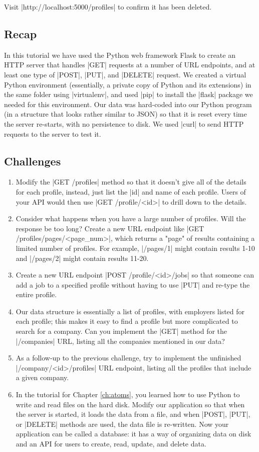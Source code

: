 \documentclass[11pt]{book}
\begin{document}
Visit |http://localhost:5000/profiles| to confirm it has been deleted.

\subsection*{Recap}

In this tutorial we have used the Python web framework Flask to create an HTTP server that handles |GET| requests at a number of URL endpoints, and at least one type of |POST|, |PUT|, and |DELETE| request.  We created a virtual Python environment (essentially, a private copy of Python and its extensions) in the same folder using |virtualenv|, and used |pip| to install the |flask| package we needed for this environment.  Our data was hard-coded into our Python program (in a structure that looks rather similar to JSON) so that it is reset every time the server re-starts, with no persistence to disk.  We used |curl| to send HTTP requests to the server to test it.


\subsection*{Challenges}

\begin{enumerate}
    \item Modify the |GET /profiles| method so that it doesn't give all of the details for each profile, instead, just list the |id| and name of each profile.  Users of your API would then use |GET /profile/<id>| to drill down to the details.
    \item Consider what happens when you have a large number of profiles.  Will the response be too long?  Create a new URL endpoint like |GET /profiles/pages/<page_num>|, which returns a "page" of results containing a limited number of profiles.  For example, |/pages/1| might contain results 1-10 and |/pages/2| might contain results 11-20.
    \item Create a new URL endpoint |POST /profile/<id>/jobs| so that someone can add a job to a specified profile without having to use |PUT| and re-type the entire profile.
    \item Our data structure is essentially a list of profiles, with employers listed for each profile; this makes it easy to find a profile but more complicated to search for a company.  Can you implement the |GET| method for the |/companies| URL, listing all the companies mentioned in our data?
    \item As a follow-up to the previous challenge, try to implement the unfinished |/company/<id>/profiles| URL endpoint, listing all the profiles that include a given company.
    \item In the tutorial for Chapter \ref{ch:atoms}, you learned how to use Python to write and read files on the hard disk.  Modify our application so that when the server is started, it loads the data from a file, and when |POST|, |PUT|, or |DELETE| methods are used, the data file is re-written.  Now your application can be called a database: it has a way of organizing data on disk and an API for users to create, read, update, and delete data.
\end{enumerate}
\end{document}
